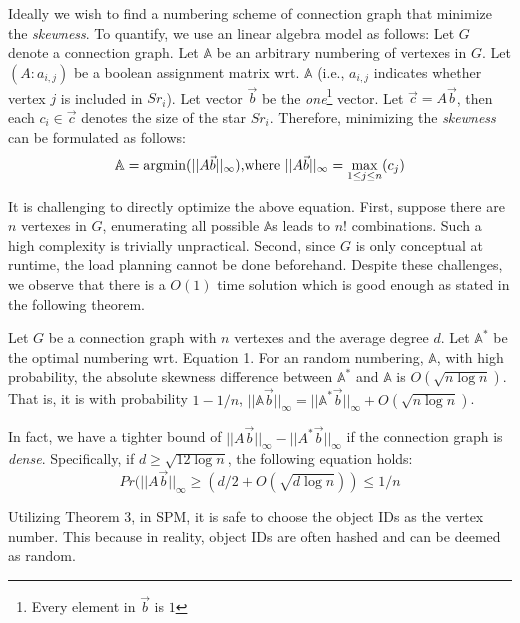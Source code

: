 Ideally we wish to find a numbering scheme of connection graph
that minimize the \emph{skewness}.
To quantify, we use an linear algebra model as follows: 
Let $G$ denote a connection graph.
Let $\mathbb{A}$ be an arbitrary numbering of vertexes in $G$.
Let $(A:a_{i,j})$ be a boolean assignment matrix wrt. $\mathbb{A}$
(i.e., $a_{i,j}$ indicates whether vertex $j$ is included in $Sr_i$). 
Let vector $\vec{b}$ be the \textit{one}\footnote{Every element in $\vec{b}$ is $1$} 
vector. Let $\vec{c} = A\vec{b}$, then each $c_i \in \vec{c}$ 
denotes the size of the star $Sr_i$.
Therefore, minimizing the \emph{skewness} can be formulated as follows:
\begin{equation}
\mathbb{A}  = \operatorname*{argmin}(||A\vec{b}||_\infty) \text{,where } ||A\vec{b}||_\infty = \max_{1\leq j \leq n}(c_j)
\end{equation}

It is challenging to directly optimize the above equation. 
First, suppose there are $n$ vertexes in $G$, enumerating
all possible $\mathbb{A}$s leads to $n!$ combinations. 
Such a high complexity is trivially unpractical. Second,
since $G$ is only conceptual at runtime, 
the load planning cannot be done beforehand. 
Despite these challenges, we observe that there is a 
$O(1)$ time solution which is good enough as stated in the 
following theorem.

\begin{theorem}
\label{THM:SPM_LB}
Let $G$ be a connection graph with $n$ vertexes and the average degree $d$.
Let $\mathbb{A}^*$ be the optimal numbering wrt. Equation 1.
For an random numbering, $\mathbb{A}$, with high probability, the 
absolute skewness difference between $\mathbb{A}^*$ and $\mathbb{A}$ is $O(\sqrt{n \log n})$.
That is, it is with probability $1-1/n$, 
$||\mathbb{A}\vec{b}||_\infty = ||\mathbb{A}^*\vec{b}||_\infty + O(\sqrt{n \log n})$.
\end{theorem}

In fact, we have a tighter bound of $||A\vec{b}||_\infty -||A^*\vec{b}||_\infty$ if 
the connection graph is \emph{dense}. Specifically, if $d\geq \sqrt{12\log n}$, the following
equation holds:
\begin{equation*}
Pr(||A\vec{b}||_\infty \geq (d/2 + O(\sqrt{d\log n})) \leq 1/n
\end{equation*}

Utilizing Theorem 3, in SPM, it is safe to choose the object IDs as 
the vertex number. This because in reality, object IDs are often 
hashed and can be deemed as random.